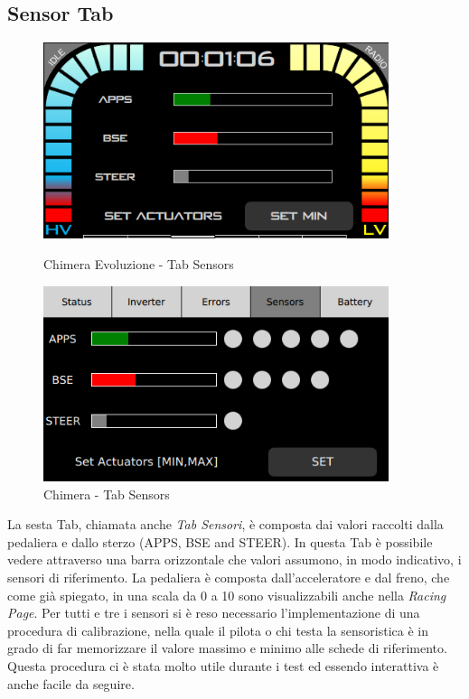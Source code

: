 \subsection{Sensor Tab}

\begin{figure}[h!]
    \centering
    \begin{minipage}{0.5\textwidth}
        \centering
        \includegraphics[width=0.9\textwidth]{./figures/UI/tabSensors.png}        
        \caption{Chimera Evoluzione - Tab Sensors}    
    \end{minipage}\hfill
    \begin{minipage}{0.5\textwidth}
        \centering
        \includegraphics[width=0.9\textwidth]{./figures/oldUI/tabSensors.png}
        \caption{Chimera - Tab Sensors}
    \end{minipage}
\end{figure}

La sesta Tab, chiamata anche \emph{Tab Sensori}, è composta dai valori raccolti dalla pedaliera e dallo sterzo (APPS, BSE and STEER).
In questa Tab è possibile vedere attraverso una barra orizzontale che valori assumono, in modo indicativo, i sensori di riferimento.
La pedaliera è composta dall'acceleratore e dal freno, che come già spiegato, in una scala da 0 a 10 sono visualizzabili anche nella \emph{Racing Page}.
Per tutti e tre i sensori si è reso necessario l'implementazione di una procedura di calibrazione, 
nella quale il pilota o chi testa la sensoristica è in grado di far memorizzare il valore massimo e minimo alle schede di riferimento.
Questa procedura ci è stata molto utile durante i test ed essendo interattiva è anche facile da seguire. 


